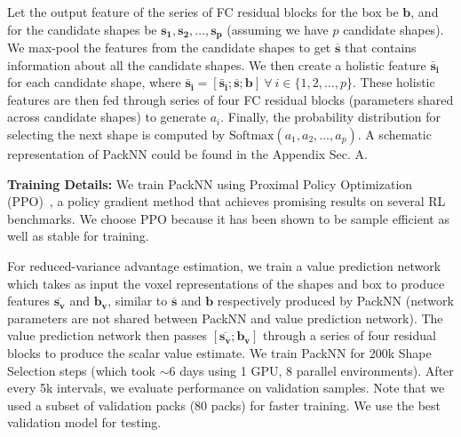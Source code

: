 \documentclass{article}
\newcommand{\fea}[1]{\boldsymbol{#1}}
\newcommand{\sfea}[2]{\boldsymbol{#1_{#2}}}
\newcommand{\bfea}[1]{\overline{\boldsymbol{#1}}}
\begin{document}
Let the output feature of the series of FC residual blocks for the box be $\fea{b}$, and for the candidate shapes be $\sfea{s}{1}, \sfea{s}{2}, \dots, \sfea{s}{p}$ (assuming we have $p$ candidate shapes). We max-pool the features from the candidate shapes to get  $\bfea{s}$ that contains information about all the candidate shapes. We then create a holistic feature $\sfea{\bar{s}}{i}$ for each candidate shape, where $\sfea{\bar{s}}{i} = [\sfea{\bar{s}}{i}; \bfea{s}; \fea{b}] \ \forall \ i \in \{1, 2, \dots , p\}$. These holistic features are then fed through series of four FC residual blocks (parameters shared across candidate shapes) to generate $a_i$. Finally, the probability distribution for selecting the next shape is computed by $\text{Softmax}(a_1, a_2, \dots, a_p)$. A schematic representation of PackNN could be found in the Appendix Sec. A.

\noindent\textbf{Training Details:} We train PackNN using Proximal Policy Optimization (PPO)~\cite{schulman2017proximal}, a policy gradient method that achieves promising results on several RL benchmarks. We choose PPO because it has been shown to be sample efficient as well as stable for training.

For reduced-variance advantage estimation, we train a value prediction network which takes as input the voxel representations of the shapes and box to produce features $\bfea{s_v}$ and $\fea{b_v}$, similar to $\bfea{s}$ and $\fea{b}$ respectively produced by PackNN (network parameters are not shared between PackNN and value prediction network). The value prediction network then passes $[\bfea{s_v}; \fea{b_v}]$ through a series of four residual blocks to produce the scalar value estimate. We train PackNN for 200k Shape Selection steps (which took $\sim$6 days using 1 GPU, 8 parallel environments). After every 5k intervals, we evaluate performance on validation samples. Note that we used a subset of validation packs (80 packs) for faster training. We use the best validation model for testing. 
\end{document}
